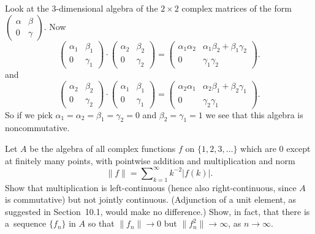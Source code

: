 \begin{enumerate}
Look at the $3$-dimensional algebra of the \(2\times 2\)
complex matrices of the form
\(\left(
\begin{smallmatrix}
\alpha & \beta \\
0 & \gamma
\end{smallmatrix}
\right)\).
Now
\begin{equation*}
\left(
  \begin{array}{ll}
   \alpha_1 & \beta_1 \\
   0 & \gamma_1
  \end{array}
\right)
\cdot
\left(
  \begin{array}{ll}
   \alpha_2 & \beta_2 \\
   0 & \gamma_2
  \end{array}
\right)
=
\left(
  \begin{array}{ll}
   \alpha_1\alpha_2 & \alpha_1\beta_2 + \beta_1\gamma_2 \\
   0 & \gamma_1\gamma_2
  \end{array}
\right).
\end{equation*}
and
\begin{equation*}
\left(
  \begin{array}{ll}
   \alpha_2 & \beta_2 \\
   0 & \gamma_2
  \end{array}
\right)
\cdot
\left(
  \begin{array}{ll}
   \alpha_1 & \beta_1 \\
   0 & \gamma_1
  \end{array}
\right)
=
\left(
  \begin{array}{ll}
   \alpha_2\alpha_1 & \alpha_2\beta_1 + \beta_2\gamma_1 \\
   0 & \gamma_2\gamma_1
  \end{array}
\right).
\end{equation*}
So if we pick \(\alpha_1 = \alpha_2 = \beta_1 = \gamma_2 = 0\)
and \(\beta_2 = \gamma_1 = 1\) we see that this algebra is noncommutative.

\begin{excopy}
Let $A$ be the algebra of all complex functions $f$ on
\(\{1, 2, 3, \ldots\}\) which are $0$
except at finitely many points, with pointwise addition and multiplication and
norm
\begin{equation*}
 \|f\| = \sum\nolimits_{k=1}^\infty k^{-2}|f(k)|.
\end{equation*}
Show that multiplication is left-continuous
  (hence also right-continuous, since $A$
is commutative) but not jointly continuous. (Adjunction of a unit element, as
suggested in Section~10.1, would make no difference.)
  Show, in fact, that there is
a~sequence \(\{f_n\}\) in $A$ so that \(\|f_n\| \to 0\)
  but \(\|f_n^2\| \to \infty\), as \(n \to \infty\).
\end{excopy}


\end{enumerate}
